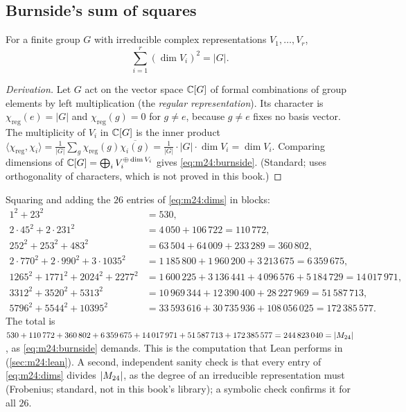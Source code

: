 \subsection*{Burnside's sum of squares}
\begin{proposition}[Burnside]\label{prop:m24:burnside}
For a finite group $G$ with irreducible complex representations $V_1,\dots,V_r$,
\begin{equation}\label{eq:m24:burnside}
 \sum_{i=1}^r(\dim V_i)^2=|G| .
\end{equation}
\end{proposition}
\begin{proof}[Derivation]
Let $G$ act on the vector space $\mathbb{C}[G]$ of formal combinations of group elements by left
multiplication (the \emph{regular representation}). Its
character is $\chi_{\mathrm{reg}}(e)=|G|$ and $\chi_{\mathrm{reg}}(g)=0$ for $g\ne e$, because
$g\ne e$ fixes no basis vector. The multiplicity of $V_i$ in $\mathbb{C}[G]$ is the inner product
$\langle\chi_{\mathrm{reg}},\chi_i\rangle=\frac1{|G|}\sum_g\chi_{\mathrm{reg}}(g)\overline{\chi_i(g)}
=\frac1{|G|}\cdot|G|\cdot\dim V_i=\dim V_i$. Comparing dimensions of $\mathbb{C}[G]=\bigoplus_iV_i^{\oplus\dim V_i}$
gives \eqref{eq:m24:burnside}. (Standard; uses orthogonality of characters, which is not
proved in this book.)
\end{proof}

\begin{example}\label{exa:m24:burnside}
Squaring and adding the $26$ entries of \eqref{eq:m24:dims} in blocks:
\begin{align*}
 1^2+23^2&=530,\\
 2\cdot45^2+2\cdot231^2&=4\,050+106\,722=110\,772,\\
 252^2+253^2+483^2&=63\,504+64\,009+233\,289=360\,802,\\
 2\cdot770^2+2\cdot990^2+3\cdot1035^2&=1\,185\,800+1\,960\,200+3\,213\,675=6\,359\,675,\\
 1265^2+1771^2+2024^2+2277^2&=1\,600\,225+3\,136\,441+4\,096\,576+5\,184\,729=14\,017\,971,\\
 3312^2+3520^2+5313^2&=10\,969\,344+12\,390\,400+28\,227\,969=51\,587\,713,\\
 5796^2+5544^2+10395^2&=33\,593\,616+30\,735\,936+108\,056\,025=172\,385\,577 .
\end{align*}
The total is $530+110\,772+360\,802+6\,359\,675+14\,017\,971+51\,587\,713+172\,385\,577
=244\,823\,040=|M_{24}|$, as \eqref{eq:m24:burnside} demands. This is the computation that Lean
performs in  (\cref{sec:m24:lean}). A second, independent sanity
check is that every entry of \eqref{eq:m24:dims} divides $|M_{24}|$, as the degree of an
irreducible representation must (Frobenius; standard, not in this book's library); a
symbolic check confirms it for all $26$.
\end{example}

